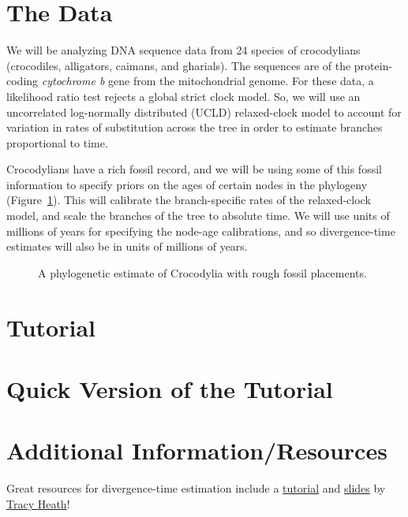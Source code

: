 \documentclass{article}
\begin{document}
\section{The Data}
We will be analyzing DNA sequence data from 24 species of crocodylians
(crocodiles, alligators, caimans, and gharials).
The sequences are of the protein-coding \emph{cytochrome b} gene from the
mitochondrial genome.
For these data, a likelihood ratio test rejects a global strict clock model.
So, we will use an uncorrelated log-normally distributed (UCLD) relaxed-clock
model \citep{Drummond2006} to account for variation in rates of substitution
across the tree in order to estimate branches proportional to time.

Crocodylians have a rich fossil record, and we will be using some of this
fossil information to specify priors on the ages of certain nodes in the
phylogeny (Figure~\ref{fig:crocFossils}).
This will calibrate the branch-specific rates of the relaxed-clock model, and
scale the branches of the tree to absolute time.
We will use units of millions of years for specifying the node-age
calibrations, and so divergence-time estimates will also be in units of
millions of years.

    \begin{figure}[htbp]
        \centering
        \caption{A phylogenetic estimate of Crocodylia with rough fossil placements.}
        \label{fig:crocFossils}
    \end{figure}

\section{Tutorial}
\newcommand{\step}[2]{\addtocounter{stepCounter}{1} {\bf \hypertarget{step\arabic{stepCounter}}{Step \arabic{stepCounter}:}}\xspace #2\par}
\newcommand{\intermediate}[1]{#1}


\newpage
\section{Quick Version of the Tutorial}
\setcounter{stepCounter}{0}
\renewcommand{\step}[2]{\addtocounter{stepCounter}{1} {\bf \hyperlink{step\arabic{stepCounter}}{Step \arabic{stepCounter}}:}\xspace #1\par}
\renewcommand{\intermediate}[1]{}


\newpage
\section{Additional Information/Resources}
Great resources for divergence-time estimation include a
\href{http://treethinkers.org/divergence-time-estimation-using-beast/}{tutorial}
and
\href{https://molevol.mbl.edu/wiki/images/6/6f/Bodega_2013_divtime_lecture.pdf}{slides}
by \href{http://phylo.bio.ku.edu/content/tracy-heath}{Tracy Heath}!

\newpage

\end{document}
